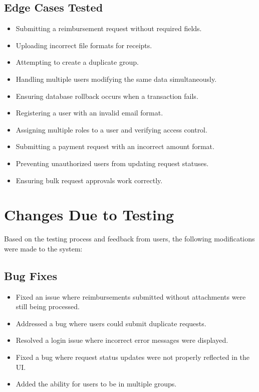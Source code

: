 \documentclass[12pt, titlepage]{article}
\begin{document}
\subsection{Edge Cases Tested}

\begin{itemize}
  \item Submitting a reimbursement request without required fields.
  \item Uploading incorrect file formats for receipts.
  \item Attempting to create a duplicate group.
  \item Handling multiple users modifying the same data simultaneously.
  \item Ensuring database rollback occurs when a transaction fails.
  \item Registering a user with an invalid email format.
  \item Assigning multiple roles to a user and verifying access control.
  \item Submitting a payment request with an incorrect amount format.
  \item Preventing unauthorized users from updating request statuses.
  \item Ensuring bulk request approvals work correctly.
\end{itemize}

\section{Changes Due to Testing}

Based on the testing process and feedback from users, the following modifications were made to the system:

\subsection{Bug Fixes}
\begin{itemize}
  \item Fixed an issue where reimbursements submitted without attachments were still being processed.
  \item Addressed a bug where users could submit duplicate requests.
  \item Resolved a login issue where incorrect error messages were displayed.
  \item Fixed a bug where request status updates were not properly reflected in the UI.
  \item Added the ability for users to be in multiple groups.
\end{itemize}
\end{document}
